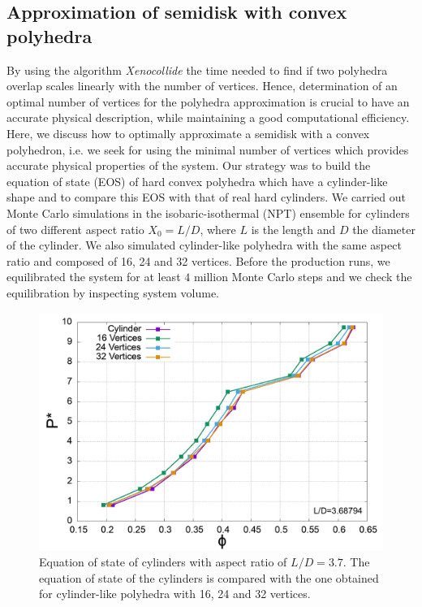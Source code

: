 \documentclass[aip,jcp, amsmath, amssymb, reprint]{revtex4-1}
\begin{document}
\subsection{Approximation of semidisk with convex polyhedra}
By using the algorithm \textit{Xenocollide} the time needed to find if two polyhedra overlap scales 
linearly with the number of vertices.
Hence, determination of an optimal number of vertices for the polyhedra approximation is crucial to have an 
accurate physical description, while maintaining a good computational efficiency.
Here, we discuss how to optimally approximate a semidisk with a convex polyhedron, i.e. 
we seek for using the minimal number of vertices which provides accurate physical properties of the system. 
Our strategy was to build the equation of state (EOS) of hard convex polyhedra which have a cylinder-like 
shape and to compare this EOS with that of real hard cylinders.
We carried out Monte Carlo simulations in the isobaric-isothermal (NPT) ensemble for
cylinders of two different aspect ratio $X_0=L/D$, where $L$ is the length and $D$ the diameter of the cylinder. 
We also simulated cylinder-like polyhedra with the same aspect ratio and composed of 16, 24 and 32 vertices.
Before the production runs, we equilibrated the system for at least $4$ million Monte Carlo steps and we check 
the equilibration by inspecting system volume.
\begin{figure}[h!] \includegraphics[width=0.95\linewidth]{cylapprox.png}
  \caption{\label{fig:cylapprox} Equation of state of cylinders with aspect ratio of $L/D=3.7$. The equation of
  state of the cylinders is compared with the one obtained for cylinder-like polyhedra with 16, 24 and 32 
vertices.}
\end{figure}
\end{document}
